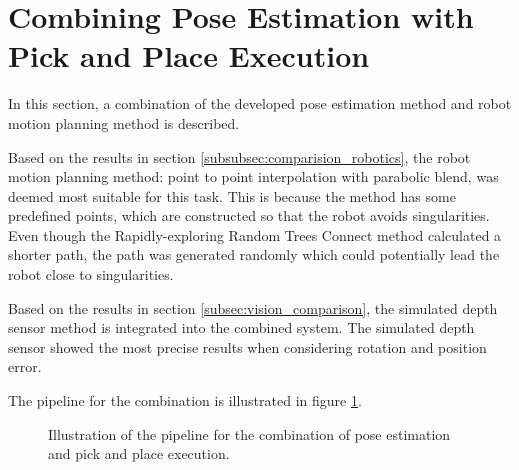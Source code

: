 \documentclass[../main.tex]{subfiles}
\begin{document}
\section{Combining Pose Estimation with Pick and Place Execution} \label{sec:combination}
In this section, a combination of the developed pose estimation method and robot motion planning method is described.

Based on the results in section \ref{subsubsec:comparision_robotics}, the robot motion planning method: point to point interpolation with parabolic blend, was deemed most suitable for this task. This is because the method has some predefined points, which are constructed so that the robot avoids singularities. Even though the Rapidly-exploring Random Trees Connect method calculated a shorter path, the path was generated randomly which could potentially lead the robot close to singularities.

Based on the results in section \ref{subsec:vision_comparison}, the simulated depth sensor method is integrated into the combined system. The simulated depth sensor showed the most precise results when considering rotation and position error. 

The pipeline for the combination is illustrated in figure \ref{fig:combi_pipeline}.
\begin{figure}[H]
    \centering
    \noindent\makebox[\textwidth][c]{}
    \caption{Illustration of the pipeline for the combination of pose estimation and pick and place execution.}
    \label{fig:combi_pipeline}
\end{figure}
\end{document}
